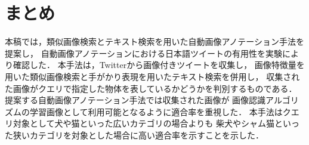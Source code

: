 \documentclass{deimj}
\begin{document}
\section{まとめ}
\label{sec:format}
本稿では，類似画像検索とテキスト検索を用いた自動画像アノテーション手法を提案し，
自動画像アノテーションにおける日本語ツイートの有用性を実験により確認した．
本手法は，Twitterから画像付きツイートを収集し，
画像特徴量を用いた類似画像検索と手がかり表現を用いたテキスト検索を併用し，
収集された画像がクエリで指定した物体を表しているかどうかを判別するものである．
提案する自動画像アノテーション手法では収集された画像が
画像認識アルゴリズムの学習画像として利用可能となるように適合率を重視した．
本手法はクエリ対象として犬や猫といった広いカテゴリの場合よりも
柴犬やシャム猫といった狭いカテゴリを対象とした場合に高い適合率を示すことを示した．

\vspace{2em}



\end{document}
